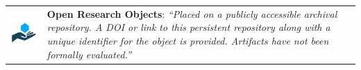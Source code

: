 \vfill


\begin{table}[h!]
  \centering
  \begin{tabular}{  c  m{8.3cm}  }
    
    \begin{minipage}{.2\textwidth}
      \includegraphics[width=\linewidth]{kappa/img/Open_Research.png}
    \end{minipage}
    &    \textbf{Open Research Objects}:
    \emph{``Placed on a publicly accessible archival repository. A DOI or link to this persistent repository along with a unique identifier for the object is provided. Artifacts have not been formally evaluated.''}
    \\[10mm]


\end{tabular}
\end{table}
